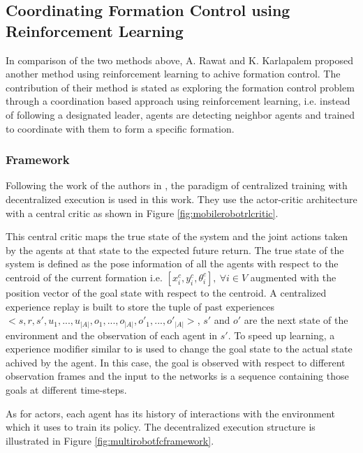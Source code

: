 \subsection{Coordinating Formation Control using Reinforcement Learning}

In comparison of the two methods above, A. Rawat and K. Karlapalem \cite{rawat2020multi} proposed another method using reinforcement learning to achive formation control.
The contribution of their method is stated as exploring the formation control problem through a coordination based approach using reinforcement learning, i.e. instead of following a designated leader, agents are detecting neighbor agents and trained to coordinate with them to form a specific formation.

\subsubsection{Framework}

Following the work of the authors in \cite{foerster2018counterfactual, lowe2017multi}, the paradigm of centralized training with decentralized execution is used in this work. 
They use the actor-critic architecture with a central critic as shown in Figure \ref{fig:mobilerobotrlcritic}. 

This central critic  \cite{foerster2018counterfactual} maps the true state of the system and the joint actions taken by the agents at that state to the expected future return. 
The true state of the system is defined as the pose information of all the agents with respect to the centroid of the current formation i.e. $ [x_{i}^{c},y_{i}^{c},\theta_{i}^{c}],\ \forall i \in V $ augmented with the position vector of the goal state with respect to the centroid.
A centralized experience replay is built to store the tuple of past experiences $ <s,r,s',u_{1},...,u_{|A|},o_{1},...,o_{|A|},o'_{1},...,o'_{|A|}>$, $s'$ and $o'$ are the next state of the environment and the observation of each agent in $s'$.
To speed up learning, a experience modifier similar to \cite{andrychowicz2017hindsight} is used to change the goal state to the actual state achived by the agent. 
In this case, the goal is observed with respect to different observation frames and the input to the networks is a sequence containing those goals at different time-steps.

As for actors, each agent has its history of interactions with the environment which it uses to train its policy. The decentralized execution structure is illustrated in Figure \ref{fig:multirobotfcframework}.


